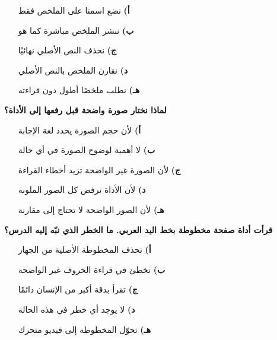 \documentclass[11pt,a4paper]{article}
\begin{document}
\begin{multicols}{2}
\begin{minipage}{\linewidth}
\begin{itemize}[leftmargin=0.95cm, labelsep=4pt, itemsep=0pt, topsep=2pt, parsep=0pt]
  \item[\textbf{أ)}] نضع اسمنا على الملخص فقط
  \item[\textbf{ب)}] ننشر الملخص مباشرة كما هو
  \item[\textbf{ج)}] نحذف النص الأصلي نهائيًا
  \item[\textbf{د)}] نقارن الملخص بالنص الأصلي
  \item[\textbf{هـ)}] نطلب ملخصًا أطول دون قراءته
\end{itemize}
\end{minipage}\par\vspace{7pt plus 4pt}
\noindent\begin{minipage}{\linewidth}
\hangindent=0.7cm\textbf{لماذا نختار صورة واضحة قبل رفعها إلى الأداة؟}
\begin{itemize}[leftmargin=0.95cm, labelsep=4pt, itemsep=0pt, topsep=2pt, parsep=0pt]
  \item[\textbf{أ)}] لأن حجم الصورة يحدد لغة الإجابة
  \item[\textbf{ب)}] لا أهمية لوضوح الصورة في أي حالة
  \item[\textbf{ج)}] لأن الصورة غير الواضحة تزيد أخطاء القراءة
  \item[\textbf{د)}] لأن الأداة ترفض كل الصور الملونة
  \item[\textbf{هـ)}] لأن الصور الواضحة لا تحتاج إلى مقارنة
\end{itemize}
\end{minipage}\par\vspace{7pt plus 4pt}
\noindent\begin{minipage}{\linewidth}
\hangindent=0.7cm\textbf{قرأت أداة صفحة مخطوطة بخط اليد العربي. ما الخطر الذي نبّه إليه الدرس؟}
\begin{itemize}[leftmargin=0.95cm, labelsep=4pt, itemsep=0pt, topsep=2pt, parsep=0pt]
  \item[\textbf{أ)}] تحذف المخطوطة الأصلية من الجهاز
  \item[\textbf{ب)}] تخطئ في قراءة الحروف غير الواضحة
  \item[\textbf{ج)}] تقرأ بدقة أكبر من الإنسان دائمًا
  \item[\textbf{د)}] لا يوجد أي خطر في هذه الحالة
  \item[\textbf{هـ)}] تحوّل المخطوطة إلى فيديو متحرك

\end{itemize}
\end{minipage}
\end{multicols}
\end{document}
